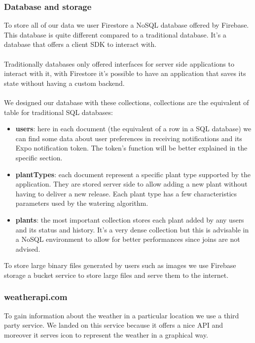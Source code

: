 \documentclass[10pt]{article}
\begin{document}
	\subsubsection{Database and storage}
	To store all of our data we user Firestore a NoSQL database offered by Firebase. This database is quite different compared to a traditional database. It's a database that offers a client SDK to interact with. \\\\ Traditionally databases only offered interfaces for server side applications to interact with it, with Firestore it's possible to have an application that saves its state without having a custom backend. \\\\ We designed our database with these collections, collections are the equivalent of table for traditional SQL databases:
	\begin{itemize}
		\item \textbf{users}: here in each document (the equivalent of a row in a SQL database) we can find some data about user preferences in receiving notifications and its Expo notification token. The token's function will be better explained in the specific section.
		\item \textbf{plantTypes}: each document represent a specific plant type supported by the application. They are stored server side to allow adding a new plant without having to deliver a new release. Each plant type has a few characteristics parameters used by the watering algorithm.
		\item \textbf{plants}: the most important collection stores each plant added by any users and its status and history. It's a very dense collection but this is advisable in a NoSQL environment to allow for better performances since joins are not advised.
	\end{itemize}
	To store large binary files generated by users such as images we use Firebase storage a bucket service to store large files and serve them to the internet.
	
	
	\subsubsection{weatherapi.com}
	To gain information about the weather in a particular location we use a third party service. We landed on this service because it offers a nice API and moreover it serves icon to represent the weather in a graphical way.
	
\end{document}
